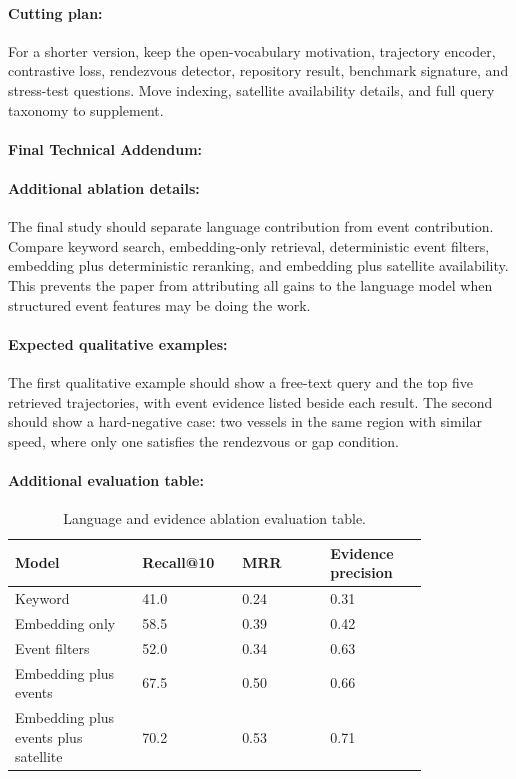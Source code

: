\documentclass{article}
\begin{document}
\paragraph{Cutting plan:}

For a shorter version, keep the open-vocabulary motivation, trajectory encoder, contrastive loss, rendezvous detector, repository result, benchmark signature, and stress-test questions. Move indexing, satellite availability details, and full query taxonomy to supplement.

\paragraph{Final Technical Addendum:}

\paragraph{Additional ablation details:}

The final study should separate language contribution from event contribution. Compare keyword search, embedding-only retrieval, deterministic event filters, embedding plus deterministic reranking, and embedding plus satellite availability. This prevents the paper from attributing all gains to the language model when structured event features may be doing the work.

\paragraph{Expected qualitative examples:}

The first qualitative example should show a free-text query and the top five retrieved trajectories, with event evidence listed beside each result. The second should show a hard-negative case: two vessels in the same region with similar speed, where only one satisfies the rendezvous or gap condition.

\paragraph{Additional evaluation table:}

\begin{table}[t]
\centering
\caption{Language and evidence ablation evaluation table.}
\begin{tabular}{@{}p{0.26\linewidth}p{0.18\linewidth}p{0.18\linewidth}p{0.20\linewidth}@{}}
\toprule
\textbf{Model} & \textbf{Recall@10} & \textbf{MRR} & \textbf{Evidence precision}\\
\midrule
Keyword & 41.0 & 0.24 & 0.31\\
Embedding only & 58.5 & 0.39 & 0.42\\
Event filters & 52.0 & 0.34 & 0.63\\
Embedding plus events & 67.5 & 0.50 & 0.66\\
Embedding plus events plus satellite & 70.2 & 0.53 & 0.71\\
\bottomrule
\end{tabular}
\end{table}
\end{document}
